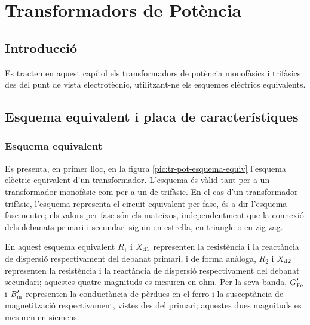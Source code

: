 
\chapter{Transformadors de Potència}\label{sec:ch-trafos-pot}

\section{Introducció}
Es tracten en aquest capítol els transformadors de potència
monofàsics i trifàsics des del punt de vista electrotècnic, utilitzant-ne els esquemes elèctrics equivalents.

\section{Esquema equivalent i placa de característiques}

\subsection{Esquema equivalent}

Es presenta, en primer lloc, en la figura \vref{pic:tr-pot-esquema-equiv} l'esquema elèctric equivalent d'un transformador.
L'esquema és vàlid tant per a un transformador monofàsic com per a un de trifàsic. En el cas d'un transformador trifàsic, l'esquema representa el circuit equivalent per fase, és a dir l'esquema fase-neutre; els valors per fase són els mateixos, independentment que la connexió dels debanats primari i secundari siguin en estrella, en triangle o en zig-zag.

\begin{center}
    
    \label{pic:tr-pot-esquema-equiv}
\end{center}

En aquest esquema equivalent $R_1$ i $X_\mathrm{d1}$ representen la resistència i la reactància de dispersió respectivament del debanat primari, i de forma anàloga, $R_2$ i $X_\mathrm{d2}$ representen la resistència i la reactància de dispersió respectivament del debanat secundari; aquestes quatre magnituds es mesuren en ohm. Per la seva banda, $G_\mathrm{Fe}'$ i $B_\mathrm{m}'$ representen la conductància de pèrdues en el ferro i la susceptància de magnetització respectivament, vistes des del primari; aquestes dues magnituds es mesuren en siemens.

